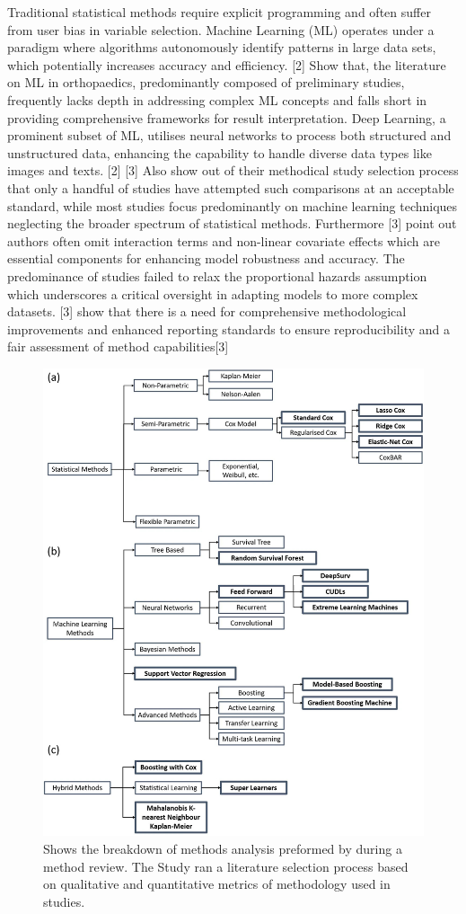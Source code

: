 Traditional statistical methods require explicit programming and often suffer from user bias in variable selection. Machine Learning (ML) operates under a paradigm where algorithms autonomously identify patterns in large data sets, which potentially increases accuracy and efficiency. [2] Show that, the literature on ML in orthopaedics, predominantly composed of preliminary studies, frequently lacks depth in addressing complex ML concepts and falls short in providing comprehensive frameworks for result interpretation. Deep Learning, a prominent subset of ML, utilises neural networks to process both structured and unstructured data, enhancing the capability to handle diverse data types like images and texts. [2] 
[3] Also show out of their methodical study selection process that only a handful of studies have attempted such comparisons at an acceptable standard, while most studies focus predominantly on machine learning techniques neglecting the broader spectrum of statistical methods. Furthermore [3] point out authors often omit interaction terms and non-linear covariate effects which are essential components for enhancing model robustness and accuracy. The predominance of studies failed to relax the proportional hazards assumption which underscores a critical oversight in adapting models to more complex datasets. [3] show that there is a need for comprehensive methodological improvements and enhanced reporting standards to ensure reproducibility and a fair assessment of method capabilities[3]
\begin{figure}
	\includegraphics[scale=0.3]{Figures/screenshots/ML_STATS_MODELS.jpg}
	\caption{Shows the breakdown of methods analysis preformed by \parencite*{} during a method review. The Study ran a literature selection process based on qualitative and quantitative metrics of methodology used in studies.}
\end{figure}
